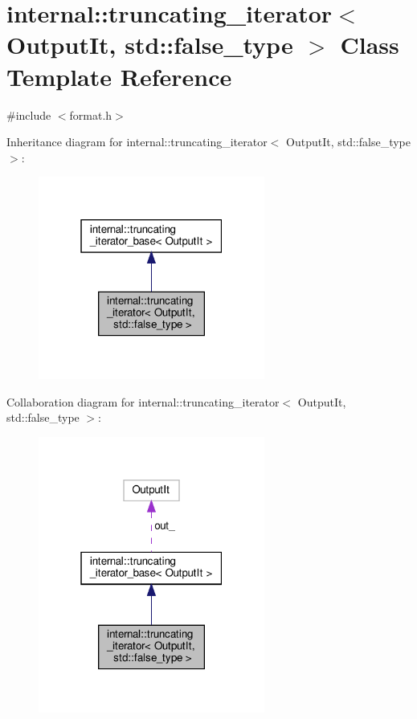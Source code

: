 \hypertarget{classinternal_1_1truncating__iterator_3_01_output_it_00_01std_1_1false__type_01_4}{}\section{internal\+:\+:truncating\+\_\+iterator$<$ Output\+It, std\+:\+:false\+\_\+type $>$ Class Template Reference}
\label{classinternal_1_1truncating__iterator_3_01_output_it_00_01std_1_1false__type_01_4}


{\ttfamily \#include $<$format.\+h$>$}



Inheritance diagram for internal\+:\+:truncating\+\_\+iterator$<$ Output\+It, std\+:\+:false\+\_\+type $>$\+:
\nopagebreak
\begin{figure}[H]
\begin{center}
\leavevmode
\includegraphics[width=211pt]{classinternal_1_1truncating__iterator_3_01_output_it_00_01std_1_1false__type_01_4__inherit__graph}
\end{center}
\end{figure}


Collaboration diagram for internal\+:\+:truncating\+\_\+iterator$<$ Output\+It, std\+:\+:false\+\_\+type $>$\+:
\nopagebreak
\begin{figure}[H]
\begin{center}
\leavevmode
\includegraphics[width=211pt]{classinternal_1_1truncating__iterator_3_01_output_it_00_01std_1_1false__type_01_4__coll__graph}
\end{center}
\end{figure}
